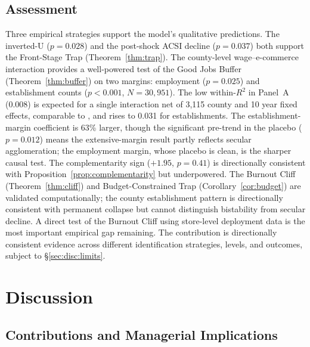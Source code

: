 \documentclass[msom,dblanonrev]{informs4}
\begin{document}
\subsection{Assessment}\label{sec:emp:assessment}

Three empirical strategies support the model's qualitative predictions. The inverted-U ($p = 0.028$) and the post-shock ACSI decline ($p = 0.037$) both support the Front-Stage Trap (Theorem~\ref{thm:trap}). The county-level wage--e-commerce interaction provides a well-powered test of the Good Jobs Buffer (Theorem~\ref{thm:buffer}) on two margins: employment ($p = 0.025$) and establishment counts ($p < 0.001$, $N = 30{,}951$). The low within-$R^2$ in Panel~A (0.008) is expected for a single interaction net of 3{,}115 county and 10 year fixed effects, comparable to \citet{chetty2009salience}, and rises to 0.031 for establishments. The establishment-margin coefficient is 63\% larger, though the significant pre-trend in the placebo ($p = 0.012$) means the extensive-margin result partly reflects secular agglomeration; the employment margin, whose placebo is clean, is the sharper causal test. The complementarity sign ($+1.95$, $p = 0.41$) is directionally consistent with Proposition~\ref{prop:complementarity} but underpowered. The Burnout Cliff (Theorem~\ref{thm:cliff}) and Budget-Constrained Trap (Corollary~\ref{cor:budget}) are validated computationally; the county establishment pattern is directionally consistent with permanent collapse but cannot distinguish bistability from secular decline. A direct test of the Burnout Cliff using store-level deployment data is the most important empirical gap remaining. The contribution is directionally consistent evidence across different identification strategies, levels, and outcomes, subject to \S\ref{sec:disc:limits}.


\section{Discussion}\label{sec:discussion}

\subsection{Contributions and Managerial Implications}\label{sec:disc:theory}
\end{document}

